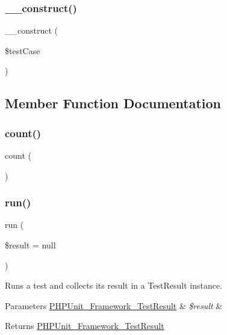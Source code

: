 \subsubsection{\texorpdfstring{\+\_\+\+\_\+construct()}{\_\_construct()}}
{\footnotesize\ttfamily \+\_\+\+\_\+construct (\begin{DoxyParamCaption}\item[{\mbox{\hyperlink{class_p_h_p_unit___framework___test_case}{P\+H\+P\+Unit\+\_\+\+Framework\+\_\+\+Test\+Case}}}]{\$test\+Case }\end{DoxyParamCaption})}



\subsection{Member Function Documentation}
\mbox{\label{class_double_test_case_ac751e87b3d4c4bf2feb03bee8b092755}} 
\subsubsection{\texorpdfstring{count()}{count()}}
{\footnotesize\ttfamily count (\begin{DoxyParamCaption}{ }\end{DoxyParamCaption})}

\mbox{\label{class_double_test_case_aba2e5a83092b40735a7a61c572cd6256}} 
\subsubsection{\texorpdfstring{run()}{run()}}
{\footnotesize\ttfamily run (\begin{DoxyParamCaption}\item[{\mbox{\hyperlink{class_p_h_p_unit___framework___test_result}{P\+H\+P\+Unit\+\_\+\+Framework\+\_\+\+Test\+Result}}}]{\$result = {\ttfamily null} }\end{DoxyParamCaption})}

Runs a test and collects its result in a Test\+Result instance.


\begin{DoxyParams}[1]{Parameters}
\mbox{\hyperlink{class_p_h_p_unit___framework___test_result}{P\+H\+P\+Unit\+\_\+\+Framework\+\_\+\+Test\+Result}} & {\em \$result} & \\
\hline
\end{DoxyParams}
\begin{DoxyReturn}{Returns}
\mbox{\hyperlink{class_p_h_p_unit___framework___test_result}{P\+H\+P\+Unit\+\_\+\+Framework\+\_\+\+Test\+Result}} 
\end{DoxyReturn}


